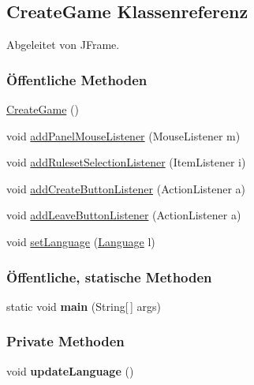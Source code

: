 \hypertarget{a00008}{\subsection{Create\-Game Klassenreferenz}
\label{a00008}
}


Abgeleitet von J\-Frame.

\subsubsection*{Öffentliche Methoden}
\begin{DoxyCompactItemize}
\item 
\hypertarget{a00008_a9c81ed380a56f523fd8a7b0c8fc349f7}{\hyperlink{a00008_a9c81ed380a56f523fd8a7b0c8fc349f7}{Create\-Game} ()}\label{a00008_a9c81ed380a56f523fd8a7b0c8fc349f7}

\item 
void \hyperlink{a00008_a0e4f14000bb92efe86644965867a5156}{add\-Panel\-Mouse\-Listener} (Mouse\-Listener m)
\item 
void \hyperlink{a00008_acf3b22c2ad67e52fbd300665503a0cb5}{add\-Ruleset\-Selection\-Listener} (Item\-Listener i)
\item 
void \hyperlink{a00008_a766141ddea860fac0deb3ceb1c65ed60}{add\-Create\-Button\-Listener} (Action\-Listener a)
\item 
void \hyperlink{a00008_aac8c97a2425ab3702a82bb0876aa3cc8}{add\-Leave\-Button\-Listener} (Action\-Listener a)
\item 
void \hyperlink{a00008_a9329ba7453dd661d50d2fb8024df3b2b}{set\-Language} (\hyperlink{a00015}{Language} l)
\end{DoxyCompactItemize}
\subsubsection*{Öffentliche, statische Methoden}
\begin{DoxyCompactItemize}
\item 
\hypertarget{a00008_a8b260eecbaabcef8473fd87ada040682}{static void {\bfseries main} (String\mbox{[}$\,$\mbox{]} args)}\label{a00008_a8b260eecbaabcef8473fd87ada040682}

\end{DoxyCompactItemize}
\subsubsection*{Private Methoden}
\begin{DoxyCompactItemize}
\item 
\hypertarget{a00008_a74cba330cee84fa07487e12fdafe29aa}{void {\bfseries update\-Language} ()}\label{a00008_a74cba330cee84fa07487e12fdafe29aa}

\end{DoxyCompactItemize}
